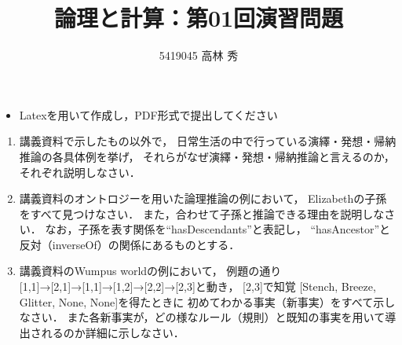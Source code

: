 \documentclass[dvipdfmx]{jsarticle}
\def\NO{01}
\def\LECTURENAME{論理と計算}
\begin{document}
\title{\LECTURENAME{}：第\NO{}回演習問題}

\author{5419045 高林 秀}

\date{}
\maketitle

\begin{itemize}
\item Latexを用いて作成し，PDF形式で提出してください
\end{itemize}


\vspace*{\baselineskip}

\begin{enumerate}\setlength{\itemsep}{\baselineskip}

\item
  講義資料で示したもの以外で，
  日常生活の中で行っている演繹・発想・帰納推論の各具体例を挙げ，
  それらがなぜ演繹・発想・帰納推論と言えるのか，それぞれ説明しなさい．

\item
  講義資料のオントロジーを用いた論理推論の例において，
  Elizabethの子孫をすべて見つけなさい．
  また，合わせて子孫と推論できる理由を説明しなさい．
  なお，子孫を表す関係を``hasDescendants''と表記し，
  ``hasAncestor''と反対（inverseOf）の関係にあるものとする．

\item
  講義資料のWumpus worldの例において，
  例題の通り[1,1]→[2,1]→[1,1]→[1,2]→[2,2]→[2,3]と動き，
  [2,3]で知覚 [Stench, Breeze, Glitter, None, None]を得たときに
  初めてわかる事実（新事実）をすべて示しなさい．
  また各新事実が，どの様なルール（規則）と既知の事実を用いて導出されるのか詳細に示しなさい．

\end{enumerate}
\end{document}
